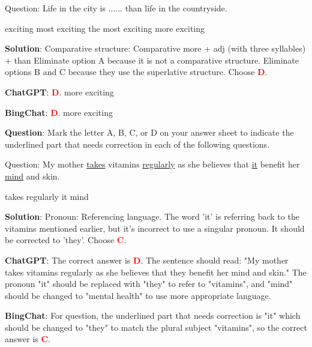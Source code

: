 \documentclass{article}
\begin{document}
{\begin{mdframed}[linewidth=1pt,linecolor=red]
		Question: Life in the city is ...... than life in the countryside.
		
		\begin{oneparchoices}
			\choice exciting
			\choice most exciting
			\choice the most exciting
			\choice more exciting
		\end{oneparchoices}
		
		\textbf{Solution}: Comparative structure: Comparative more + adj (with three syllables) + than 
		Eliminate option A because it is not a comparative structure. Eliminate options B and C because they use the superlative structure. Choose \textcolor{red}{\textbf{D}}. 
		
		\textbf{ChatGPT}: \textcolor{red}{\textbf{D}}. more exciting 
		
		\textbf{BingChat}: \textcolor{red}{\textbf{D}}. more exciting
		
	\end{mdframed}
	
	\begin{mdframed}[linewidth=1pt,linecolor=red] \textbf{Question}: Mark the letter A, B, C, or D on your answer sheet to indicate the underlined part that needs correction in each of the following questions.
		
		Question: My mother \underline{takes} vitamins \underline{regularly} as she believes that \underline{it} benefit her \underline{mind} and skin.
		
		\begin{oneparchoices}
			\choice takes
			\choice regularly
			\choice it
			\choice mind
		\end{oneparchoices}
		
		\textbf{Solution}: Pronoun: Referencing language. The word 'it' is referring back to the vitamins mentioned earlier, but it's incorrect to use a singular pronoun. It should be corrected to 'they'. Choose \textcolor{red}{\textbf{C}}. 
		
		\textbf{ChatGPT}: The correct answer is \textcolor{red}{\textbf{D}}. The sentence should read: "My mother takes vitamins regularly as she believes that they benefit her mind and skin." The pronoun "it" should be replaced with "they" to refer to "vitamins", and "mind" should be changed to "mental health" to use more appropriate language.
		
		\textbf{BingChat}: For question, the underlined part that needs correction is "it" which should be changed to "they" to match the plural subject "vitamins", so the correct answer is \textcolor{red}{\textbf{C}}.
		

\end{mdframed}}
\end{document}
